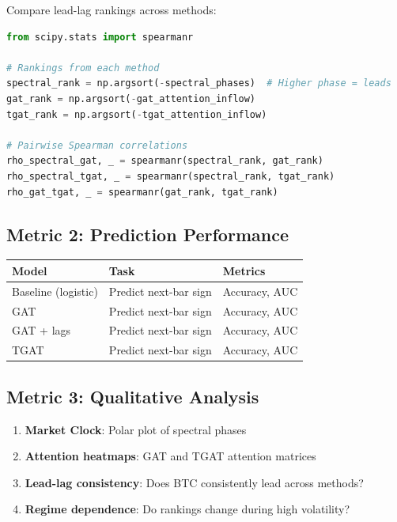 \documentclass[11pt, a4paper]{article}
\begin{document}
Compare lead-lag rankings across methods:

\begin{lstlisting}[language=Python]
from scipy.stats import spearmanr

# Rankings from each method
spectral_rank = np.argsort(-spectral_phases)  # Higher phase = leads
gat_rank = np.argsort(-gat_attention_inflow)
tgat_rank = np.argsort(-tgat_attention_inflow)

# Pairwise Spearman correlations
rho_spectral_gat, _ = spearmanr(spectral_rank, gat_rank)
rho_spectral_tgat, _ = spearmanr(spectral_rank, tgat_rank)
rho_gat_tgat, _ = spearmanr(gat_rank, tgat_rank)
\end{lstlisting}

\subsection{Metric 2: Prediction Performance}

\begin{center}
\begin{tabular}{lll}
\toprule
\textbf{Model} & \textbf{Task} & \textbf{Metrics} \\
\midrule
Baseline (logistic) & Predict next-bar sign & Accuracy, AUC \\
GAT & Predict next-bar sign & Accuracy, AUC \\
GAT + lags & Predict next-bar sign & Accuracy, AUC \\
TGAT & Predict next-bar sign & Accuracy, AUC \\
\bottomrule
\end{tabular}
\end{center}

\subsection{Metric 3: Qualitative Analysis}

\begin{enumerate}
    \item \textbf{Market Clock}: Polar plot of spectral phases
    \item \textbf{Attention heatmaps}: GAT and TGAT attention matrices
    \item \textbf{Lead-lag consistency}: Does BTC consistently lead across methods?
    \item \textbf{Regime dependence}: Do rankings change during high volatility?
\end{enumerate}
\end{document}
